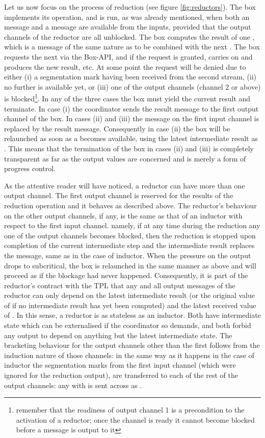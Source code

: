 \documentclass[11pt]{report}
\begin{document}
Let us now focus on the process of reduction (see figure  \ref{fig:reductors}). The box implements its  operation, and is run, as was already mentioned, when both an  message and a  message are available from the inputs, provided that the output channels of the reductor are all unblocked.
The box computes the result of one , which is a message of the same nature as  to be combined with the next .
The box requests the next  via the Box-API, and if the request is granted, carries on and produces the new result, etc.
At some point the request will be denied
due to either (i) a segmentation mark having been received from the second stream, (ii) no further  is available yet, or (iii) one of the output channels (channel 2 or above) is blocked\footnote{remember that the readiness of output channel 1 is a precondition to the activation of a reductor; once the channel is ready it cannot become blocked before a message is output to it}. In any of the three cases the box must yield the current result and terminate. In case (i) the coordinator sends the result message to the first output channel of the box. In cases (ii) and (iii) the message on the
first input channel is replaced by the result message. Consequently in case (ii) the box will be relaunched as soon as a  becomes available,
using the latest intermediate result as . This means that the termination of the box in cases (ii) and (iii) is completely transparent as far as the output values are concerned and is merely a form of progress control.

As the attentive reader will have noticed, a reductor can have more than one output channel. The first output channel is reserved for the results of the reduction operation and it behaves as described above.
The reductor's behaviour on the other output channels, if any, is the same as that of an inductor with respect
to the first input channel. namely, if at any time during the reduction any one of the output channels becomes blocked, then the reduction is stopped upon completion of the current intermediate step and the intermediate result replaces the  message, same as in the case of inductor. When the pressure on the output drops to subcritical, the box is relaunched in the same manner as above and will proceed as if the blockage had never happened. Consequently, it is part of the reductor's contract with the TPL that any and all output messages of the reductor can only depend on the latest intermediate result (or the original value of  if no intermediate result has yet been computed) and the latest received value of . In this sense, a reductor is as stateless as an inductor. Both have intermediate state which can be externalised if the coordinator so demands, and both forbid any output to depend on anything but the latest intermediate state.
The bracketing behaviour for the output channels other than the first follows from the induction nature of those channels:
in the same way as it happens in the case of inductor the segmentation marks from the first input channel (which were
ignored for the reduction output), are transferred to each of the rest of the output channels: any  with 
is sent across as .
\end{document}
